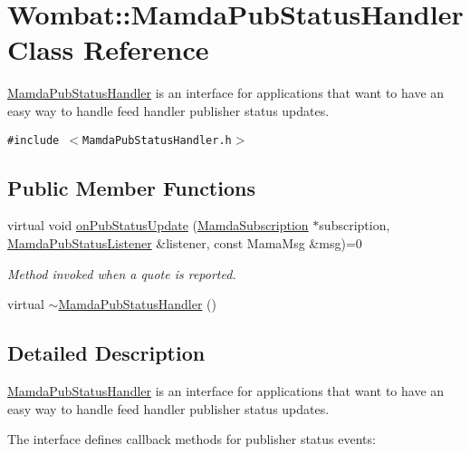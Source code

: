 \hypertarget{classWombat_1_1MamdaPubStatusHandler}{
\section{Wombat::Mamda\-Pub\-Status\-Handler Class Reference}
\label{classWombat_1_1MamdaPubStatusHandler}
}
\hyperlink{classWombat_1_1MamdaPubStatusHandler}{Mamda\-Pub\-Status\-Handler} is an interface for applications that want to have an easy way to handle feed handler publisher status updates.  


{\tt \#include $<$Mamda\-Pub\-Status\-Handler.h$>$}

\subsection*{Public Member Functions}
\begin{CompactItemize}
\item 
virtual void \hyperlink{classWombat_1_1MamdaPubStatusHandler_8fecd04e098fbcc485dfb247082ace81}{on\-Pub\-Status\-Update} (\hyperlink{classWombat_1_1MamdaSubscription}{Mamda\-Subscription} $\ast$subscription, \hyperlink{classWombat_1_1MamdaPubStatusListener}{Mamda\-Pub\-Status\-Listener} \&listener, const Mama\-Msg \&msg)=0
\begin{CompactList}\small\item\em Method invoked when a quote is reported. \item\end{CompactList}\item 
virtual \hyperlink{classWombat_1_1MamdaPubStatusHandler_53e6f5da15ee115e3d2597e1bfcc2221}{$\sim$Mamda\-Pub\-Status\-Handler} ()
\end{CompactItemize}


\subsection{Detailed Description}
\hyperlink{classWombat_1_1MamdaPubStatusHandler}{Mamda\-Pub\-Status\-Handler} is an interface for applications that want to have an easy way to handle feed handler publisher status updates. 

The interface defines callback methods for publisher status events: 



